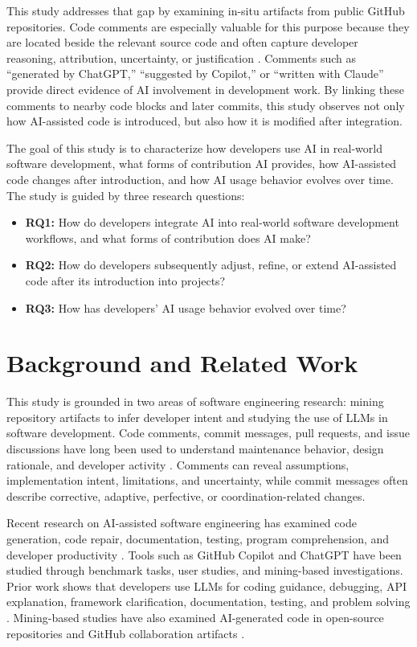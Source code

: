 \documentclass[12pt,draftclsnofoot,onecolumn]{IEEEtran}
\begin{document}
This study addresses that gap by examining in-situ artifacts from public GitHub repositories. Code comments are especially valuable for this purpose because they are located beside the relevant source code and often capture developer reasoning, attribution, uncertainty, or justification \cite{rani2023decade,tan2015code}. Comments such as ``generated by ChatGPT,'' ``suggested by Copilot,'' or ``written with Claude'' provide direct evidence of AI involvement in development work. By linking these comments to nearby code blocks and later commits, this study observes not only how AI-assisted code is introduced, but also how it is modified after integration.

The goal of this study is to characterize how developers use AI in real-world software development, what forms of contribution AI provides, how AI-assisted code changes after introduction, and how AI usage behavior evolves over time. The study is guided by three research questions:

\begin{itemize}
    \item \textbf{RQ1:} How do developers integrate AI into real-world software development workflows, and what forms of contribution does AI make?
    \item \textbf{RQ2:} How do developers subsequently adjust, refine, or extend AI-assisted code after its introduction into projects?
    \item \textbf{RQ3:} How has developers' AI usage behavior evolved over time?
\end{itemize}

\section{Background and Related Work}

This study is grounded in two areas of software engineering research: mining repository artifacts to infer developer intent and studying the use of LLMs in software development. Code comments, commit messages, pull requests, and issue discussions have long been used to understand maintenance behavior, design rationale, and developer activity \cite{hindle2009automated}. Comments can reveal assumptions, implementation intent, limitations, and uncertainty, while commit messages often describe corrective, adaptive, perfective, or coordination-related changes.

Recent research on AI-assisted software engineering has examined code generation, code repair, documentation, testing, program comprehension, and developer productivity \cite{fan2023large}. Tools such as GitHub Copilot and ChatGPT have been studied through benchmark tasks, user studies, and mining-based investigations. Prior work shows that developers use LLMs for coding guidance, debugging, API explanation, framework clarification, documentation, testing, and problem solving \cite{hao2024sharedconversations}. Mining-based studies have also examined AI-generated code in open-source repositories and GitHub collaboration artifacts \cite{grewal2024analyzing}.
\end{document}
